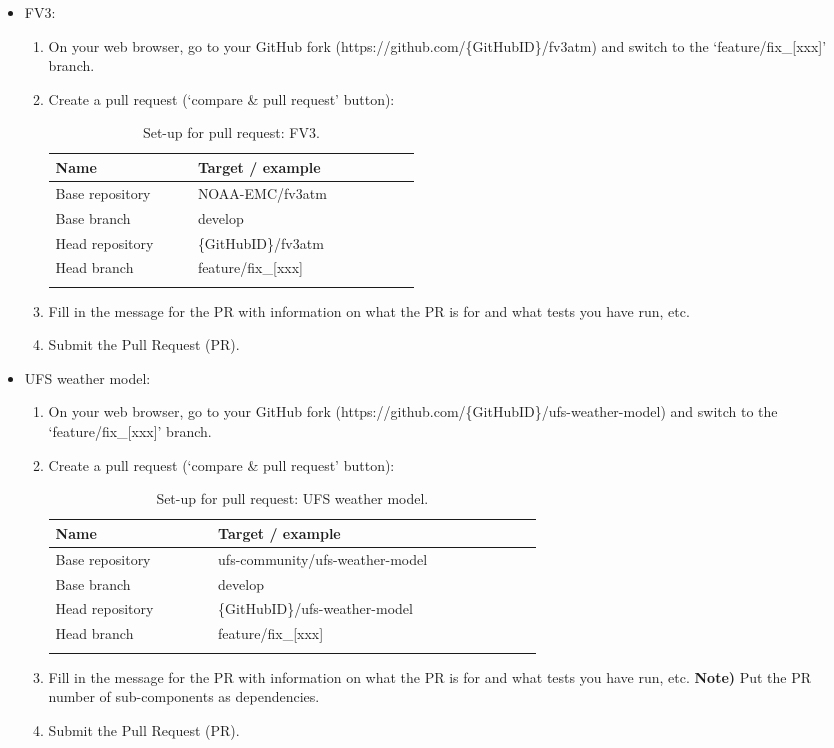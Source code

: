 \documentclass[11pt,fleqn]{report}              %
\begin{document}
\begin{itemize}

\item FV3:

\begin{enumerate}
\item On your web browser, go to your GitHub fork (https://github.com/\{GitHubID\}/fv3atm) and switch to the `feature/fix\_[xxx]' branch.
\item Create a pull request (`compare \& pull request' button):
{
\fontsize{10}{12}\selectfont
\begin{longtable}{p{0.2\linewidth} | p{0.25\linewidth} }
\hline
\hline
 Name & Target / example \\
\hline
 Base repository & NOAA-EMC/fv3atm   \\
 Base branch & develop \\
 Head repository & \{GitHubID\}/fv3atm \\
 Head branch & feature/fix\_[xxx] \\
\hline
\caption{Set-up for pull request: FV3.}
\label{table:PR_setup_fv3}
\end{longtable}
}
\item Fill in the message for the PR with information on what the PR is for and what tests you have run, etc.
\item Submit the Pull Request (PR).
\end{enumerate} 


\item UFS weather model:

\begin{enumerate}
\item On your web browser, go to your GitHub fork (https://github.com/\{GitHubID\}/ufs-weather-model) and switch to the `feature/fix\_[xxx]' branch.
\item Create a pull request (`compare \& pull request' button):
{
\fontsize{10}{12}\selectfont
\begin{longtable}{p{0.2\linewidth} | p{0.4\linewidth} }
\hline
\hline
 Name & Target / example \\
\hline
 Base repository & ufs-community/ufs-weather-model   \\
 Base branch & develop \\
 Head repository & \{GitHubID\}/ufs-weather-model \\
 Head branch & feature/fix\_[xxx] \\
\hline
\caption{Set-up for pull request: UFS weather model.}
\label{table:PR_setup_weather}
\end{longtable}
}
\item Fill in the message for the PR with information on what the PR is for and what tests you have run, etc.
{\bf Note)} Put the PR number of sub-components as dependencies.
\item Submit the Pull Request (PR).
\end{enumerate} 

\end{itemize}
\end{document}
